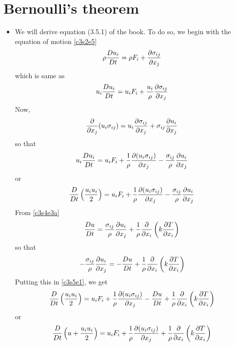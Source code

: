 \section{Bernoulli's theorem}\label{c3s5}
\begin{itemize}
\item We will derive equation (3.5.1) of the book. To do so, we begin with the equation of motion \eqref{c3s2e5}
\[
\rho\frac{D{u_i}}{Dt} = \rho F_i + \frac{\partial{\sigma_{ij}}}{\partial{x_j}}
\]
which is same as
\[
u_i\frac{D{u_i}}{Dt} = u_iF_i + \frac{u_i}{\rho}\frac{\partial{\sigma_{ij}}}{\partial{x_j}}
\]
Now,
\[
\frac{\partial}{\partial x_j} (u_i\sigma_{ij}) = u_i\frac{\partial{\sigma_{ij}}}{\partial{x_j}} + \sigma_{ij}\frac{\partial{u_i}}{\partial{x_j}}
\]
so that
\[
u_i\frac{D{u_i}}{Dt} = u_iF_i + \frac{1}{\rho}\frac{\partial{(u_i\sigma_{ij})}}{\partial{x_j}} - \frac{\sigma_{ij}}{\rho}\frac{\partial{u_i}}{\partial{x_j}}
\]
or
\begin{equation}\label{c3s5e1}
\frac{D}{Dt}\left(\frac{u_iu_i}{2}\right) = u_iF_i + \frac{1}{\rho}\frac{\partial{(u_i\sigma_{ij})}}{\partial{x_j}} - \frac{\sigma_{ij}}{\rho}\frac{\partial{u_i}}{\partial{x_j}}
\end{equation}
From \eqref{c3s4e3a}
\[
\frac{D{u}}{Dt} = \frac{\sigma_{ij}}{\rho}\frac{\partial{u_i}}{\partial{x_j}} + \frac{1}{\rho}\frac{\partial}{\partial x_i}\left(k\frac{\partial{T}}{\partial{x_i}}\right)
\]
so that
\[
-\frac{\sigma_{ij}}{\rho}\frac{\partial{u_i}}{\partial{x_j}} = -\frac{D{u}}{Dt} + \frac{1}{\rho}\frac{\partial}{\partial x_i}\left(k\frac{\partial{T}}{\partial{x_i}}\right)
\]
Putting this in \eqref{c3s5e1}, we get
\[
\frac{D}{Dt}\left(\frac{u_iu_i}{2}\right) = u_iF_i + \frac{1}{\rho}\frac{\partial{(u_i\sigma_{ij})}}{\partial{x_j}} -\frac{D{u}}{Dt} + \frac{1}{\rho}\frac{\partial}{\partial x_i}\left(k\frac{\partial{T}}{\partial{x_i}}\right)
\]
or
\begin{equation}\label{c3s5e2}
\frac{D}{Dt}\left(u + \frac{u_iu_i}{2}\right) = u_iF_i + \frac{1}{\rho}\frac{\partial{(u_i\sigma_{ij})}}{\partial{x_j}} + \frac{1}{\rho}\frac{\partial}{\partial x_i}\left(k\frac{\partial{T}}{\partial{x_i}}\right)
\end{equation}


\end{itemize}
